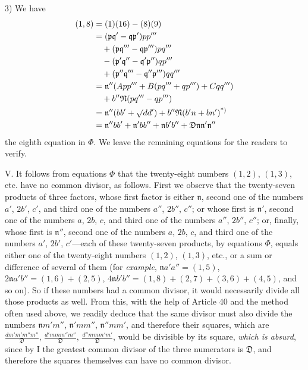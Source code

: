 3) We have
\[
\begin{aligned}
(1,8)&=(1)(16)-(8)(9)\\
&=(\mathfrak{p}\mathfrak{q}'-\mathfrak{q}\mathfrak{p}')pp'''\\&\quad+(\mathfrak{p}\mathfrak{q}'''-\mathfrak{q}\mathfrak{p}''')pq'''\\&\quad-(\mathfrak{p}'\mathfrak{q}''-\mathfrak{q}'\mathfrak{p}'')qp'''\\&\quad+(\mathfrak{p}''\mathfrak{q}'''-\mathfrak{q}''\mathfrak{p}''')qq'''\\
&=\mathfrak{n}''(App'''+B(pq'''+qp''')+Cqq''')\\&\quad+b''\mathfrak{N}(pq'''-qp''')\\
&=\mathfrak{n}''(bb'+\surd dd')+b''\mathfrak{N}(b'n+bn')\text{\textsuperscript{*)}}\\
&=\mathfrak{n}''bb'+\mathfrak{n}'bb''+\mathfrak{n}b'b''+\mathfrak{D}\mathfrak{n}\mathfrak{n}'\mathfrak{n}''
\end{aligned}
\]
the eighth equation in $\Phi$. We leave the remaining equations for the readers to verify.

V. It follows from equations $\Phi$ that the twenty-eight numbers $(1,2)$, $(1,3)$, etc. have no common divisor, as follows. First we observe that the twenty-seven products of three factors, whose first factor is either $\mathfrak{n}$, second one of the numbers $a'$, $2b'$, $c'$, and third one of the numbers $a''$, $2b''$, $c''$; or whose first is $\mathfrak{n}'$, second one of the numbers $a$, $2b$, $c$, and third one of the numbers $a''$, $2b''$, $c''$; or, finally, whose first is $\mathfrak{n}''$, second one of the numbers $a$, $2b$, $c$, and third one of the numbers $a'$, $2b'$, $c'$---each of these twenty-seven products, by equations $\Phi$, equals either one of the twenty-eight numbers $(1,2)$, $(1,3)$, etc., or a sum or difference of several of them (for \textit{example}, $\mathfrak{n}a'a''=(1,5)$, $2\mathfrak{n}a'b''=(1,6)+(2,5)$, $4\mathfrak{n}b'b''=(1,8)+(2,7)+(3,6)+(4,5)$, and so on). So if these numbers had a common divisor, it would necessarily divide all those products as well. From this, with the help of Article 40 and the method often used above, we readily deduce that the same divisor must also divide the numbers $\mathfrak{n}m'm''$, $\mathfrak{n}'mm''$, $\mathfrak{n}''mm'$, and therefore their
squares, which are $\frac{dm'm'm''m''}{\mathfrak{D}}$, $\frac{d'mmm''m''}{\mathfrak{D}}$, $\frac{d''mmm'm'}{\mathfrak{D}}$, would be divisible by its square, \textit{which is absurd}, since by I the greatest common divisor of the three numerators is $\mathfrak{D}$, and therefore the squares themselves can have no common divisor.

